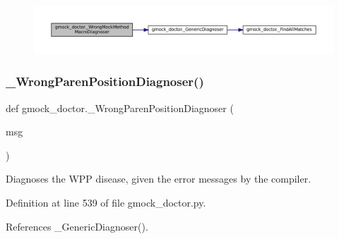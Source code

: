 \begin{figure}[H]
\begin{center}
\leavevmode
\includegraphics[width=350pt]{namespacegmock__doctor_a430611c0e038abaa33ae320b7118779b_cgraph}
\end{center}
\end{figure}
\mbox{\label{namespacegmock__doctor_a89b0bfee48942a164f7a4e1e923f3a48}} 
\subsubsection{\texorpdfstring{\+\_\+\+Wrong\+Paren\+Position\+Diagnoser()}{\_WrongParenPositionDiagnoser()}}
{\footnotesize\ttfamily def gmock\+\_\+doctor.\+\_\+\+Wrong\+Paren\+Position\+Diagnoser (\begin{DoxyParamCaption}\item[{}]{msg }\end{DoxyParamCaption})\hspace{0.3cm}{\ttfamily [private]}}

\begin{DoxyVerb}Diagnoses the WPP disease, given the error messages by the compiler.\end{DoxyVerb}
 

Definition at line 539 of file gmock\+\_\+doctor.\+py.



References \+\_\+\+Generic\+Diagnoser().


